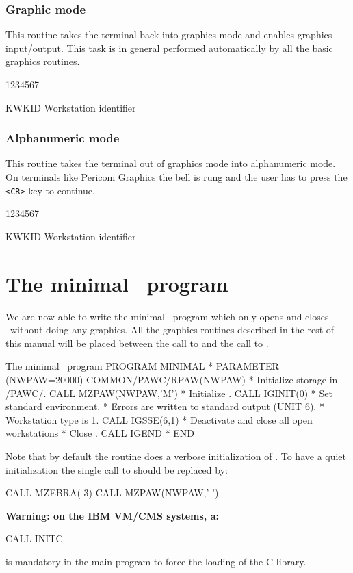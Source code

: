 \begin{minipage}[t]{.49\textwidth}
\subsubsection*{Graphic mode}
\Action
This routine takes the terminal back into graphics mode and e\-na\-bles
gra\-phics in\-put/out\-put. This task is in general performed automatically by
all the basic graphics routines.
\Pdesc
\begin{DLtt}{1234567}
\item[KWKID] Workstation identifier
\end{DLtt}
\end{minipage}
\hfill
\begin{minipage}[t]{.49\textwidth} 
\subsubsection{Alphanumeric mode}
\Action
This routine takes the terminal out of graphics mode into alphanumeric mode. On 
terminals like Pericom Graphics the bell is rung and the user has to press the 
{\tt <CR>} key to continue.
\Pdesc
\begin{DLtt}{1234567}
\item[KWKID] Workstation identifier
\end{DLtt}
\end{minipage}
 
\section{The minimal \HIGZ~program}
We are now able to write the minimal \HIGZ~program which only opens and closes
\HIGZ~without doing any graphics. All the graphics routines described in the
rest of this manual will be placed between the call to  and the
call to .
\begin{XMPt}{The minimal \HIGZ~program}
      PROGRAM MINIMAL
*
      PARAMETER (NWPAW=20000)
      COMMON/PAWC/RPAW(NWPAW)
*                                Initialize storage in /PAWC/.
      CALL MZPAW(NWPAW,'M')
*                                Initialize \HIGZ.
      CALL IGINIT(0)
*                                Set standard environment.
*                                Errors are written to standard output (UNIT 6).
*                                Workstation type is 1.
      CALL IGSSE(6,1)
*                                Deactivate and close all open workstations 
*                                Close \HIGZ.
      CALL IGEND
*
      END
\end{XMPt}
Note that by default the  routine does a verbose initialization of
\ZEBRA. 
To have a quiet initialization the single call to  should be replaced by:

\begin{XMP}
      CALL MZEBRA(-3)
      CALL MZPAW(NWPAW,' ')
\end{XMP}

{\bf
 Warning: on the IBM VM/CMS systems, a: 

\begin{XMP}
      CALL INITC
\end{XMP}

is mandatory in the main program to force the loading of the C library.
}
